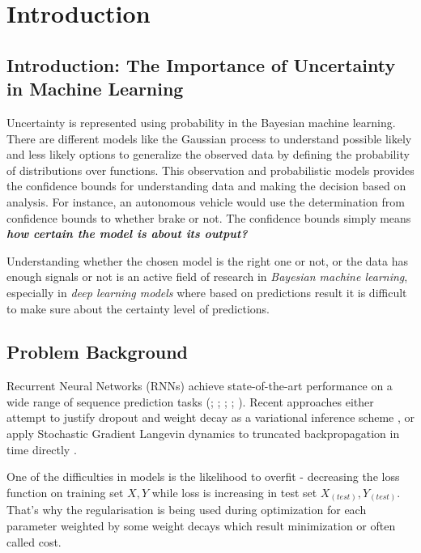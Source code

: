 \chapter{Introduction}
\label{chap:intro}

\section{Introduction: The Importance of Uncertainty in Machine Learning}

Uncertainty is represented using probability in the Bayesian machine learning. There are different models like the Gaussian process to understand possible likely and less likely options to generalize the observed data by defining the probability of distributions over functions. This observation and probabilistic models provides the confidence bounds for understanding data and making the decision based on analysis. For instance, an autonomous vehicle would use the determination from confidence bounds to whether brake or not. The confidence bounds simply means \textbf{\textit{how certain the model is about its output?}}

Understanding whether the chosen model is the right one or not, or the data has enough signals or not is an active field of research \cite{Ghahramani2015} in \textit{Bayesian machine learning}, especially in \textit{deep learning models} where based on predictions result it is difficult to make sure about the certainty level of predictions.  


\section{Problem Background}

Recurrent Neural Networks (RNNs) achieve state-of-the-art performance on a wide range of sequence prediction tasks (\cite{Wu2016}; \cite{Amodei2015}; \cite{Jozefowicz2016}; \cite{Zaremba2014}; \cite{Lu2016}).
Recent approaches either attempt to justify dropout \cite{Srivastava2014} and weight decay as a variational inference scheme \cite{Gal2015}, or apply Stochastic Gradient Langevin dynamics \cite{Welling2011} to truncated backpropagation in time directly \cite{Gan2016}.

One of the difficulties in models is the likelihood to overfit - decreasing the loss function on training set \textbf{$X, Y$} while loss is increasing in test set \textbf{$X_(test), Y_(test)$}. That's why the regularisation is being used during optimization for each parameter weighted by some weight decays which result minimization or often called cost.

